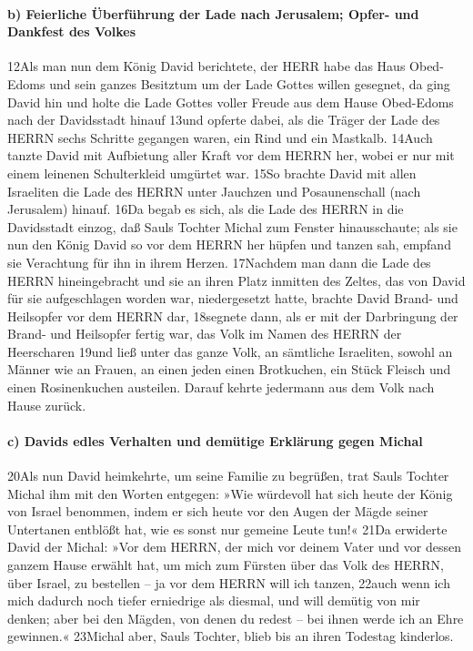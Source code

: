 \hypertarget{b-feierliche-uxfcberfuxfchrung-der-lade-nach-jerusalem-opfer--und-dankfest-des-volkes}{%
\paragraph{b) Feierliche Überführung der Lade nach Jerusalem; Opfer- und
Dankfest des
Volkes}\label{b-feierliche-uxfcberfuxfchrung-der-lade-nach-jerusalem-opfer--und-dankfest-des-volkes}}

12Als man nun dem König David berichtete, der HERR habe das Haus
Obed-Edoms und sein ganzes Besitztum um der Lade Gottes willen gesegnet,
da ging David hin und holte die Lade Gottes voller Freude aus dem Hause
Obed-Edoms nach der Davidsstadt hinauf 13und opferte dabei, als die
Träger der Lade des HERRN sechs Schritte gegangen waren, ein Rind und
ein Mastkalb. 14Auch tanzte David mit Aufbietung aller Kraft vor dem
HERRN her, wobei er nur mit einem leinenen Schulterkleid umgürtet war.
15So brachte David mit allen Israeliten die Lade des HERRN unter
Jauchzen und Posaunenschall (nach Jerusalem) hinauf. 16Da begab es sich,
als die Lade des HERRN in die Davidsstadt einzog, daß Sauls Tochter
Michal zum Fenster hinausschaute; als sie nun den König David so vor dem
HERRN her hüpfen und tanzen sah, empfand sie Verachtung für ihn in ihrem
Herzen. 17Nachdem man dann die Lade des HERRN hineingebracht und sie an
ihren Platz inmitten des Zeltes, das von David für sie aufgeschlagen
worden war, niedergesetzt hatte, brachte David Brand- und Heilsopfer vor
dem HERRN dar, 18segnete dann, als er mit der Darbringung der Brand- und
Heilsopfer fertig war, das Volk im Namen des HERRN der Heerscharen 19und
ließ unter das ganze Volk, an sämtliche Israeliten, sowohl an Männer wie
an Frauen, an einen jeden einen Brotkuchen, ein Stück Fleisch und einen
Rosinenkuchen austeilen. Darauf kehrte jedermann aus dem Volk nach Hause
zurück.

\hypertarget{c-davids-edles-verhalten-und-demuxfctige-erkluxe4rung-gegen-michal}{%
\paragraph{c) Davids edles Verhalten und demütige Erklärung gegen
Michal}\label{c-davids-edles-verhalten-und-demuxfctige-erkluxe4rung-gegen-michal}}

20Als nun David heimkehrte, um seine Familie zu begrüßen, trat Sauls
Tochter Michal ihm mit den Worten entgegen: »Wie würdevoll hat sich
heute der König von Israel benommen, indem er sich heute vor den Augen
der Mägde seiner Untertanen entblößt hat, wie es sonst nur gemeine Leute
tun!« 21Da erwiderte David der Michal: »Vor dem HERRN, der mich vor
deinem Vater und vor dessen ganzem Hause erwählt hat, um mich zum
Fürsten über das Volk des HERRN, über Israel, zu bestellen -- ja vor dem
HERRN will ich tanzen, 22auch wenn ich mich dadurch noch tiefer
erniedrige als diesmal, und will demütig von mir denken; aber bei den
Mägden, von denen du redest -- bei ihnen werde ich an Ehre gewinnen.«
23Michal aber, Sauls Tochter, blieb bis an ihren Todestag kinderlos.

